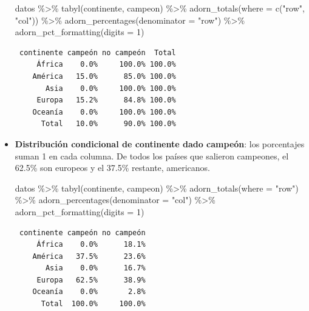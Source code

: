 \documentclass[
]{book}
\newenvironment{Shaded}{\begin{snugshade}}{\end{snugshade}}
\newcommand{\AttributeTok}[1]{\textcolor[rgb]{0.77,0.63,0.00}{#1}}
\newcommand{\DecValTok}[1]{\textcolor[rgb]{0.00,0.00,0.81}{#1}}
\newcommand{\FunctionTok}[1]{\textcolor[rgb]{0.00,0.00,0.00}{#1}}
\newcommand{\NormalTok}[1]{#1}
\newcommand{\SpecialCharTok}[1]{\textcolor[rgb]{0.00,0.00,0.00}{#1}}
\newcommand{\StringTok}[1]{\textcolor[rgb]{0.31,0.60,0.02}{#1}}
\begin{document}
\begin{itemize}
\begin{Shaded}
\begin{Highlighting}[]
\NormalTok{datos }\SpecialCharTok{\%\textgreater{}\%} 
  \FunctionTok{tabyl}\NormalTok{(continente, campeon) }\SpecialCharTok{\%\textgreater{}\%} 
  \FunctionTok{adorn\_totals}\NormalTok{(}\AttributeTok{where =} \FunctionTok{c}\NormalTok{(}\StringTok{"row"}\NormalTok{, }\StringTok{"col"}\NormalTok{)) }\SpecialCharTok{\%\textgreater{}\%} 
    \FunctionTok{adorn\_percentages}\NormalTok{(}\AttributeTok{denominator =} \StringTok{"row"}\NormalTok{) }\SpecialCharTok{\%\textgreater{}\%}
  \FunctionTok{adorn\_pct\_formatting}\NormalTok{(}\AttributeTok{digits =} \DecValTok{1}\NormalTok{)}
\end{Highlighting}
\end{Shaded}

\begin{verbatim}
 continente campeón no campeón  Total
     África    0.0%     100.0% 100.0%
    América   15.0%      85.0% 100.0%
       Asia    0.0%     100.0% 100.0%
     Europa   15.2%      84.8% 100.0%
    Oceanía    0.0%     100.0% 100.0%
      Total   10.0%      90.0% 100.0%
\end{verbatim}
\item
  \textbf{Distribución condicional de continente dado campeón}: los porcentajes suman 1 en cada columna. De todos los países que salieron campeones, el 62.5\% son europeos y el 37.5\% restante, americanos.

\begin{Shaded}
\begin{Highlighting}[]
\NormalTok{datos }\SpecialCharTok{\%\textgreater{}\%} 
  \FunctionTok{tabyl}\NormalTok{(continente, campeon) }\SpecialCharTok{\%\textgreater{}\%} 
  \FunctionTok{adorn\_totals}\NormalTok{(}\AttributeTok{where =} \StringTok{"row"}\NormalTok{) }\SpecialCharTok{\%\textgreater{}\%} 
    \FunctionTok{adorn\_percentages}\NormalTok{(}\AttributeTok{denominator =} \StringTok{"col"}\NormalTok{) }\SpecialCharTok{\%\textgreater{}\%}
  \FunctionTok{adorn\_pct\_formatting}\NormalTok{(}\AttributeTok{digits =} \DecValTok{1}\NormalTok{)}
\end{Highlighting}
\end{Shaded}

\begin{verbatim}
 continente campeón no campeón
     África    0.0%      18.1%
    América   37.5%      23.6%
       Asia    0.0%      16.7%
     Europa   62.5%      38.9%
    Oceanía    0.0%       2.8%
      Total  100.0%     100.0%
\end{verbatim}
\end{itemize}
\end{document}
